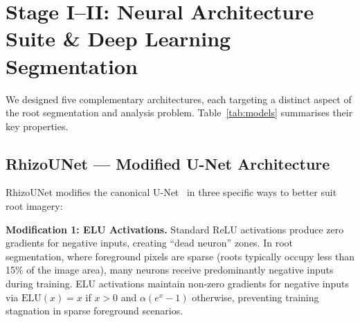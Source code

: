 \documentclass[final,3p,times,nonatbib]{elsarticle}
\begin{document}
\section{Stage I--II: Neural Architecture Suite \& Deep Learning Segmentation}
\label{sec:architectures}

We designed five complementary architectures, each targeting a distinct aspect of the root segmentation and analysis problem. Table~\ref{tab:models} summarises their key properties.

\begin{table}[htbp]
\centering
\caption{\textbf{Comparative performance of four vision architectures} on the combined validation set. Bold indicates best-in-class.}
\label{tab:models}
\vspace{0.2cm}
\end{table}


\subsection{RhizoUNet --- Modified U-Net Architecture}
RhizoUNet modifies the canonical U-Net~\cite{ronneberger2015unet} in three specific ways to better suit root imagery:

\textbf{Modification 1: ELU Activations.} Standard ReLU activations produce zero gradients for negative inputs, creating ``dead neuron'' zones. In root segmentation, where foreground pixels are sparse (roots typically occupy less than 15\% of the image area), many neurons receive predominantly negative inputs during training. ELU activations maintain non-zero gradients for negative inputs via $\text{ELU}(x) = x$ if $x > 0$ and $\alpha(e^x - 1)$ otherwise, preventing training stagnation in sparse foreground scenarios.
\end{document}
